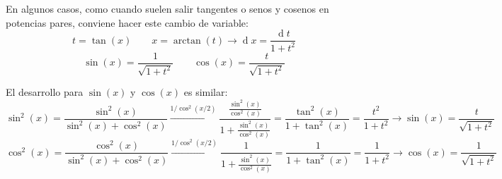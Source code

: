 \documentclass[a4paper]{article}
\renewcommand{\d}[1]{\ensuremath{\operatorname{d}\!{#1}}}
\begin{document}
En algunos casos, como cuando suelen salir tangentes o senos y cosenos en potencias pares, conviene hacer este cambio de variable:
$$t = \tan\left(x\right) \qquad x = \arctan(t) \rightarrow \d{x} = \frac{\d{t}}{1+t^2}$$
$$\sin(x) = \frac{1}{\sqrt{1+t^2}} \qquad \cos(x) = \frac{t}{\sqrt{1+t^2}} $$

El desarrollo para $\sin(x)$ y $\cos(x)$ es similar:
$$\sin^2(x) = \frac{\sin^2(x)}{\sin^2(x) + \cos^2(x)} \xrightarrow{1/\cos^2(x/2)} 
\frac{\frac{\sin^2(x)}{\cos^2(x)}}{1+\frac{\sin^2(x)}{\cos^2(x)}} = \frac{\tan^2(x)}{1+\tan^2(x)} = \frac{t^2}{1+t^2} \rightarrow \sin(x) = \frac{t}{\sqrt{1+t^2}} $$
$$\cos^2(x) = \frac{\cos^2(x)}{\sin^2(x) + \cos^2(x)} \xrightarrow{1/\cos^2(x/2)} 
\frac{1}{1+\frac{\sin^2(x)}{\cos^2(x)}} = \frac{1}{1+\tan^2(x)} = \frac{1}{1+t^2} \rightarrow \cos(x) = \frac{1}{\sqrt{1+t^2}} $$
\end{document}

